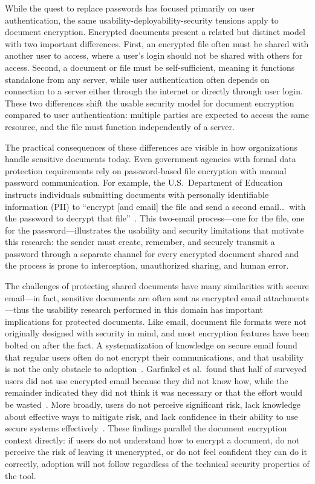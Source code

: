 While the quest to replace passwords has focused primarily on user authentication, the same usability-deployability-security tensions apply to document encryption. Encrypted documents present a related but distinct model with two important differences. First, an encrypted file often must be shared with another user to access, where a user's login should not be shared with others for access. Second, a document or file must be self-sufficient, meaning it functions standalone from any server, while user authentication often depends on connection to a server either through the internet or directly through user login. These two differences shift the usable security model for document encryption compared to user authentication: multiple parties are expected to access the same resource, and the file must function independently of a server.

The practical consequences of these differences are visible in how organizations handle sensitive documents today. Even government agencies with formal data protection requirements rely on password-based file encryption with manual password communication. For example, the U.S.~Department of Education instructs individuals submitting documents with personally identifiable information (PII) to ``encrypt [and email] the file and send a second email\ldots\ with the password to decrypt that file''~\cite{doe_encryption}. This two-email process---one for the file, one for the password---illustrates the usability and security limitations that motivate this research: the sender must create, remember, and securely transmit a password through a separate channel for every encrypted document shared and the process is prone to interception, unauthorized sharing, and human error.

The challenges of protecting shared documents have many similarities with secure email---in fact, sensitive documents are often sent as encrypted email attachments---thus the usability research performed in this domain has important implications for protected documents. Like email, document file formats were not originally designed with security in mind, and most encryption features have been bolted on after the fact. A systematization of knowledge on secure email found that regular users often do not encrypt their communications, and that usability is not the only obstacle to adoption~\cite{borisov_sok_2021}. Garfinkel et al.\ found that half of surveyed users did not use encrypted email because they did not know how, while the remainder indicated they did not think it was necessary or that the effort would be wasted~\cite{garfinkel_email_2005}. More broadly, users do not perceive significant risk, lack knowledge about effective ways to mitigate risk, and lack confidence in their ability to use secure systems effectively~\cite{borisov_sok_2021}. These findings parallel the document encryption context directly: if users do not understand how to encrypt a document, do not perceive the risk of leaving it unencrypted, or do not feel confident they can do it correctly, adoption will not follow regardless of the technical security properties of the tool.

